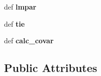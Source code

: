 \begin{DoxyCompactItemize}
\item 
\hypertarget{classmpfit_1_1mpfit_abb9d174821c887e5d5aa2ca2cc7519f7}{def {\bfseries lmpar}}\label{classmpfit_1_1mpfit_abb9d174821c887e5d5aa2ca2cc7519f7}

\item 
\hypertarget{classmpfit_1_1mpfit_a68b9dc3249164597f0d8ed1f6f889ebf}{def {\bfseries tie}}\label{classmpfit_1_1mpfit_a68b9dc3249164597f0d8ed1f6f889ebf}

\item 
\hypertarget{classmpfit_1_1mpfit_a217e3eaade969816474f06387c0002ae}{def {\bfseries calc\-\_\-covar}}\label{classmpfit_1_1mpfit_a217e3eaade969816474f06387c0002ae}

\end{DoxyCompactItemize}
\subsection*{Public Attributes}
